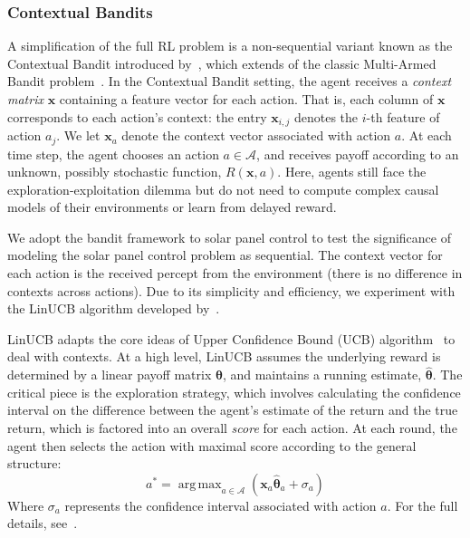 \documentclass{article}
\newcommand{\mc}{\mathcal}
\DeclareMathOperator*{\argmax}{arg\,max}
\begin{document}
{%
\subsubsection{Contextual Bandits}

A simplification of the full RL problem is a non-sequential variant known as the Contextual Bandit introduced by~\citet{wang2005bandit}, which extends of the classic Multi-Armed Bandit problem~\cite{gittins1979bandit}. In the Contextual Bandit setting, the agent receives a {\it context matrix} $\bm{x}$ containing a feature vector for each action. That is, each column of $\bm{x}$ corresponds to each action's context: the entry $\bm{x}_{i,j}$ denotes the $i$-th feature of action $a_j$. We let $\bm{x}_a$ denote the context vector associated with action $a$. At each time step, the agent chooses an action $a \in \mc{A}$, and receives payoff according to an unknown, possibly stochastic function, $R(\bm{x},a)$. Here, agents still face the exploration-exploitation dilemma but do not need to compute complex causal models of their environments or learn from delayed reward.

We adopt the bandit framework to solar panel control to test the significance of modeling the solar panel control problem as sequential. The context vector for each action is the received percept from the environment (there is no difference in contexts across actions). Due to its simplicity and efficiency, we experiment with the LinUCB algorithm developed by~\citet{li2010contextual}.

LinUCB adapts the core ideas of Upper Confidence Bound (UCB) algorithm~\cite{auer2002finite} to deal with contexts. At a high level, LinUCB assumes the underlying reward is determined by a linear payoff matrix $\bm{\theta}$, and maintains a running estimate, $\hat{\bm{\theta}}$. The critical piece is the exploration strategy, which involves calculating the confidence interval on the difference between the agent's estimate of the return and the true return, which is factored into an overall {\it score} for each action. At each round, the agent then selects the action with maximal score according to the general structure:
\begin{equation}
a^* = \argmax_{a \in \mc{A}} \left(\bm{x}_a \hat{\bm{\theta}}_a + \sigma_{a}\right)
\end{equation}
Where $\sigma_a$ represents the confidence interval associated with action $a$. For the full details, see~\citet{li2010contextual}.

}
\end{document}
